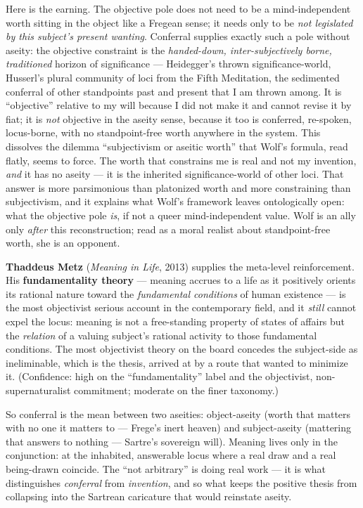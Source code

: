 \documentclass[11pt]{article}
\begin{document}
Here is the earning. The objective pole does not need to be a mind-independent worth sitting in the object like a Fregean sense; it needs only to be \emph{not legislated by this subject's present wanting}. Conferral supplies exactly such a pole without aseity: the objective constraint is the \emph{handed-down, inter-subjectively borne, traditioned} horizon of significance — Heidegger's thrown significance-world, Husserl's plural community of loci from the Fifth Meditation, the sedimented conferral of other standpoints past and present that I am thrown among. It is ``objective'' relative to my will because I did not make it and cannot revise it by fiat; it is \emph{not} objective in the aseity sense, because it too is conferred, re-spoken, locus-borne, with no standpoint-free worth anywhere in the system. This dissolves the dilemma ``subjectivism or aseitic worth'' that Wolf's formula, read flatly, seems to force. The worth that constrains me is real and not my invention, \emph{and} it has no aseity — it is the inherited significance-world of other loci. That answer is more parsimonious than platonized worth and more constraining than subjectivism, and it explains what Wolf's framework leaves ontologically open: what the objective pole \emph{is}, if not a queer mind-independent value. Wolf is an ally only \emph{after} this reconstruction; read as a moral realist about standpoint-free worth, she is an opponent.

\textbf{Thaddeus Metz} (\emph{Meaning in Life}, 2013) supplies the meta-level reinforcement. His \textbf{fundamentality theory} — meaning accrues to a life as it positively orients its rational nature toward the \emph{fundamental conditions} of human existence — is the most objectivist serious account in the contemporary field, and it \emph{still} cannot expel the locus: meaning is not a free-standing property of states of affairs but the \emph{relation} of a valuing subject's rational activity to those fundamental conditions. The most objectivist theory on the board concedes the subject-side as ineliminable, which is the thesis, arrived at by a route that wanted to minimize it. (Confidence: high on the ``fundamentality'' label and the objectivist, non-supernaturalist commitment; moderate on the finer taxonomy.)

So conferral is the mean between two aseities: object-aseity (worth that matters with no one it matters to — Frege's inert heaven) and subject-aseity (mattering that answers to nothing — Sartre's sovereign will). Meaning lives only in the conjunction: at the inhabited, answerable locus where a real draw and a real being-drawn coincide. The ``not arbitrary'' is doing real work — it is what distinguishes \emph{conferral} from \emph{invention}, and so what keeps the positive thesis from collapsing into the Sartrean caricature that would reinstate aseity.
\end{document}
